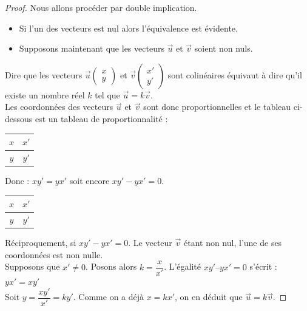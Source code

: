 \begin{proof}

Nous allons procéder par double implication.
\begin{itemize}[label=\textbullet]
\item  Si l'un des vecteurs est nul alors l'équivalence est évidente.
\item  Supposons maintenant que les vecteurs $\overrightarrow{u}$ et $\overrightarrow{v}$ soient non nuls.
\end{itemize}
Dire que les vecteurs $\overrightarrow{u}\begin{pmatrix} 
x \\
y
 \end{pmatrix}$ et $\overrightarrow{v}\begin{pmatrix} 
x' \\
y'
 \end{pmatrix}$ sont colinéaires équivaut à dire qu'il existe un nombre réel $k$ tel que $\overrightarrow{u}=k\overrightarrow{v}$.\\



Les coordonnées des vecteurs $\overrightarrow{u}$ et $\overrightarrow{v}$ sont donc proportionnelles et le tableau ci- dessous est un tableau de proportionnalité :
\begin{center}
\begin{tabular}{|c|c|}
\hline 
$x$ & $x'$ \\
\hline
$y$ & $y'$ \\
\hline
\end{tabular}
\end{center}
Donc : $xy'=yx'$ soit encore $xy'-yx'=0$.\\


\begin{center}
\begin{tabular}{|c|c|}
\hline 
$x$ & $x'$ \\
\hline
$y$ & $y'$ \\
\hline
\end{tabular}
\end{center}


Réciproquement, si $xy' - yx' = 0$.
Le vecteur $\overrightarrow{v}$ étant non nul, l'une de ses coordonnées est non nulle. \\Supposons que 
$x'\neq 0$. Posons alors $k = \dfrac{x}{x'}$. L'égalité $xy' – yx' = 0$ s'écrit : $yx' = xy'$ \\
Soit $y=\dfrac{xy'}{x'}=ky'$.
Comme on a déjà $x=kx'$, on en déduit que $\overrightarrow{u}=k\overrightarrow{v}$.
\end{proof}


